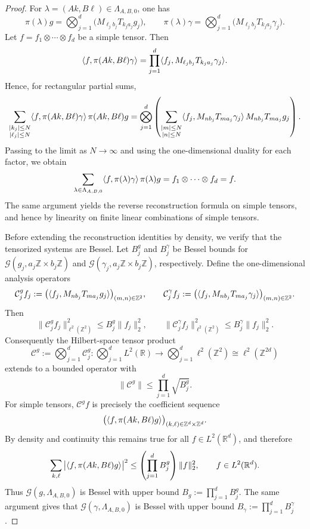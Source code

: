 \documentclass[final,1p,times,authoryear]{elsarticle}
\theoremstyle{definition}
\newcommand{\R}{\mathbb{R}}
\newcommand{\Z}{\mathbb{Z}}
\newcommand{\1}{\mathbf{1}}
\DeclarePairedDelimiter{\inner}{\langle}{\rangle}
\begin{document}
\begin{proof}
For $\lambda=(Ak,B\ell)\in \Lambda_{A,B,0}$, one has
$$
\pi(\lambda)g
=
\bigotimes_{j=1}^d \big(M_{\ell_j b_j}T_{k_j a_j}g_j\big),
\qquad
\pi(\lambda)\gamma
=
\bigotimes_{j=1}^d \big(M_{\ell_j b_j}T_{k_j a_j}\gamma_j\big).
$$
Let $f=f_1\otimes\cdots\otimes f_d$ be a simple tensor. Then
$$
\inner{f,\pi(Ak,B\ell)\gamma}
=
\prod_{j=1}^d
\inner{f_j,M_{\ell_j b_j}T_{k_j a_j}\gamma_j}.
$$
Hence, for rectangular partial sums,
$$
\sum_{\substack{|k_j|\leq N\\ |\ell_j|\leq N}}
\inner{f,\pi(Ak,B\ell)\gamma}\,\pi(Ak,B\ell)g
=
\bigotimes_{j=1}^d
\left(
\sum_{\substack{|m|\leq N\\ |n|\leq N}}
\inner{f_j,M_{nb_j}T_{ma_j}\gamma_j}\,M_{nb_j}T_{ma_j}g_j
\right).
$$
Passing to the limit as $N\to\infty$ and using the one-dimensional duality for each factor, we obtain
$$
\sum_{\lambda\in\Lambda_{A,B,0}}
\inner{f,\pi(\lambda)\gamma}\,\pi(\lambda)g
=
f_1\otimes\cdots\otimes f_d
=
f.
$$
{The same argument yields the reverse reconstruction formula on simple tensors, and hence by linearity
on finite linear combinations of simple tensors.}

{Before extending the reconstruction identities by density, we verify that the tensorized systems are
Bessel. Let $B_j^g$ and $B_j^\gamma$ be Bessel bounds for
$\mathcal G(g_j,a_j\Z\times b_j\Z)$ and $\mathcal G(\gamma_j,a_j\Z\times b_j\Z)$, respectively. Define the
one-dimensional analysis operators
$$
\mathcal C_j^g f_j
:=
\big(\inner{f_j,M_{nb_j}T_{ma_j}g_j}\big)_{(m,n)\in\Z^2},
\qquad
\mathcal C_j^\gamma f_j
:=
\big(\inner{f_j,M_{nb_j}T_{ma_j}\gamma_j}\big)_{(m,n)\in\Z^2}.
$$
Then
$$
\|\mathcal C_j^g f_j\|_{\ell^2(\Z^2)}^2\le B_j^g\|f_j\|_2^2,
\qquad
\|\mathcal C_j^\gamma f_j\|_{\ell^2(\Z^2)}^2\le B_j^\gamma\|f_j\|_2^2.
$$
Consequently the Hilbert-space tensor product
$$
\mathcal C^g:=\bigotimes_{j=1}^d \mathcal C_j^g:
\bigotimes_{j=1}^d L^2(\R)\longrightarrow
\bigotimes_{j=1}^d \ell^2(\Z^2)\cong \ell^2(\Z^{2d})
$$
extends to a bounded operator with
$$
\|\mathcal C^g\|\le \prod_{j=1}^d \sqrt{B_j^g}.
$$
For simple tensors, $\mathcal C^g f$ is precisely the coefficient sequence
$$
\big(\inner{f,\pi(Ak,B\ell)g}\big)_{(k,\ell)\in\Z^d\times\Z^d}.
$$
By density and continuity this remains true for all $f\in L^2(\R^d)$, and therefore
$$
\sum_{k,\ell}\big|\inner{f,\pi(Ak,B\ell)g}\big|^2
\le
\left(\prod_{j=1}^d B_j^g\right)\|f\|_2^2,
\qquad f\in L^2(\R^d).
$$
Thus $\mathcal G(g,\Lambda_{A,B,0})$ is Bessel with upper bound
$B_g:=\prod_{j=1}^d B_j^g$. The same argument gives that
$\mathcal G(\gamma,\Lambda_{A,B,0})$ is Bessel with upper bound
$B_\gamma:=\prod_{j=1}^d B_j^\gamma$.}


\end{proof}
\end{document}
